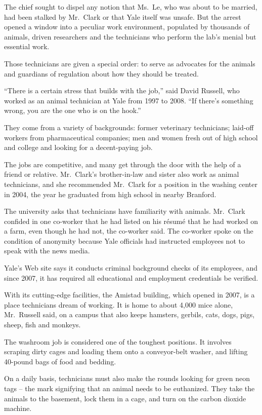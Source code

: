 ﻿\documentclass[12pt]{article}
\begin{document}
The chief sought to dispel any notion that Ms.~Le, who was about to be married, had been stalked by
Mr.~Clark or that Yale itself was unsafe. But the arrest opened a window into a
peculiar\cite{peculiar} work environment, populated by thousands of animals, driven researchers and
the technicians who perform the lab's menial but essential work.

Those technicians are given a special order: to serve as advocates for the animals and guardians of
regulation about how they should be treated.

``There is a certain stress that builds with the job,'' said David Russell, who worked as an animal
technician at Yale from 1997 to 2008. ``If there's something wrong, you are the one who is on the
hook.''

They come from a variety of backgrounds: former veterinary technicians; laid-off workers from
pharmaceutical companies; men and women fresh out of high school and college and looking for a
decent-paying job.

The jobs are competitive, and many get through the door with the help of a friend or relative.
Mr.~Clark's brother-in-law and sister also work as animal technicians, and she recommended Mr.~Clark
for a position in the washing center in 2004, the year he graduated from high school in nearby
Branford.

The university asks that technicians have familiarity with animals. Mr.~Clark confided in one
co-worker that he had listed on his r\'esum\'e that he had worked on a farm, even though he had not,
the co-worker said. The co-worker spoke on the condition of anonymity because Yale officials had
instructed employees not to speak with the news media.

Yale's Web site says it conducts criminal background checks of its employees, and since 2007, it has
required all educational and employment credentials be verified.

With its cutting-edge facilities, the Amistad building, which opened in 2007, is a place technicians
dream of working. It is home to about 4,000 mice alone, Mr.~Russell said, on a campus that also
keeps hamsters, gerbils, cats, dogs, pigs, sheep, fish and monkeys.

The washroom job is considered one of the toughest positions. It involves scraping dirty cages and
loading them onto a conveyor-belt washer, and lifting 40-pound bags of food and bedding.

On a daily basis, technicians must also make the rounds looking for green neon tags -- the mark
signifying that an animal needs to be euthanized. They take the animals to the basement, lock them
in a cage, and turn on the carbon dioxide machine.
\end{document}

